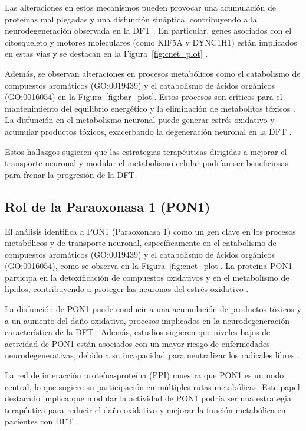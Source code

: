 Las alteraciones en estos mecanismos pueden provocar una acumulación de proteínas mal plegadas y una disfunción sináptica, contribuyendo a la neurodegeneración observada en la DFT \cite{moreno2016axonal}. En particular, genes asociados con el citosqueleto y motores moleculares (como KIF5A y DYNC1H1) están implicados en estas vías y se destacan en la Figura~\ref{fig:cnet_plot} \cite{reid2019kif5a}.

Además, se observan alteraciones en procesos metabólicos como el catabolismo de compuestos aromáticos (GO:0019439) y el catabolismo de ácidos orgánicos (GO:0016054) en la Figura~\ref{fig:bar_plot}. Estos procesos son críticos para el mantenimiento del equilibrio energético y la eliminación de metabolitos tóxicos \cite{mccabe2001metabolism}. La disfunción en el metabolismo neuronal puede generar estrés oxidativo y acumular productos tóxicos, exacerbando la degeneración neuronal en la DFT \cite{seelaar2011clinical}.

Estos hallazgos sugieren que las estrategias terapéuticas dirigidas a mejorar el transporte neuronal y modular el metabolismo celular podrían ser beneficiosas para frenar la progresión de la DFT.


\subsection{Rol de la Paraoxonasa 1 (PON1)}

El análisis identifica a PON1 (Paraoxonasa 1) como un gen clave en los procesos metabólicos y de transporte neuronal, específicamente en el catabolismo de compuestos aromáticos (GO:0019439) y el catabolismo de ácidos orgánicos (GO:0016054), como se observa en la Figura~\ref{fig:cnet_plot}. La proteína PON1 participa en la detoxificación de compuestos oxidativos y en el metabolismo de lípidos, contribuyendo a proteger las neuronas del estrés oxidativo \cite{costa2005paraoxonase}.

La disfunción de PON1 puede conducir a una acumulación de productos tóxicos y a un aumento del daño oxidativo, procesos implicados en la neurodegeneración característica de la DFT \cite{kim2006paraoxonase}. Además, estudios sugieren que niveles bajos de actividad de PON1 están asociados con un mayor riesgo de enfermedades neurodegenerativas, debido a su incapacidad para neutralizar los radicales libres \cite{brophy2001paraoxonase}.

La red de interacción proteína-proteína (PPI) muestra que PON1 es un nodo central, lo que sugiere su participación en múltiples rutas metabólicas. Este papel destacado implica que modular la actividad de PON1 podría ser una estrategia terapéutica para reducir el daño oxidativo y mejorar la función metabólica en pacientes con DFT \cite{james2009paraoxonase}.
